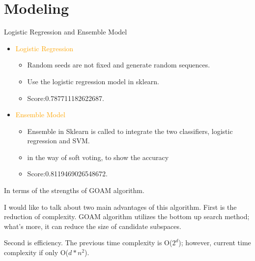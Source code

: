 \documentclass[
 size=14pt,
 paper=smartboard,  %
 mode=present, 		%
 display=slides, 	%
 style=tuliplab,  	%
 pauseslide,
 fleqn,leqno]{powerdot}
\begin{document}
\section{Modeling}
\begin{slide}[toc=,bm=]{Logistic Regression and Ensemble Model}
  \begin{itemize}
  \item
  \textcolor{orange}{Logistic Regression}
  
  \begin{itemize}
  \item
  Random seeds are not fixed and generate random sequences.
  \item
  Use the logistic regression model in sklearn.
  \item
  Score:0.787711182622687.
  
  
  
  \end{itemize}
  
  \item
  \textcolor{orange}{Ensemble Model}
  
  \begin{itemize}
  \item
  Ensemble in Sklearn is called to integrate the two classifiers, logistic regression and SVM.
  
  \item 
  in the way of soft voting, to show the accuracy
  \item   
  Score:0.8119469026548672.  
\end{itemize}
  
  \end{itemize}
  
  \begin{note}
  In terms of the strengths of GOAM algorithm.
  
  I would like to talk about two main advantages of this algorithm.
  First is the reduction of complexity.
  GOAM algorithm utilizes the bottom up search method;
  what's more,
  it can reduce the size of candidate subspaces.
  
  Second is efficiency.
  The previous time complexity is O($2^d$);
  however,
  current time complexity if only O($d*n^2$).
  \end{note}
  
  \end{slide}
\end{document}
